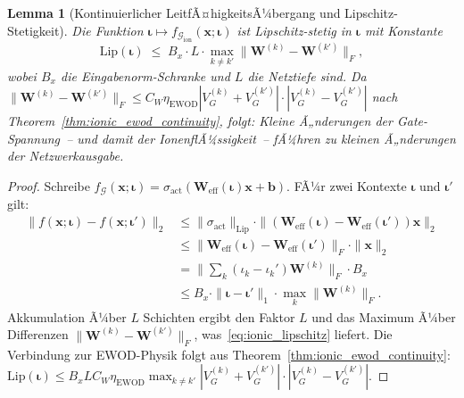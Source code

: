 ﻿\documentclass[12pt, a4paper, openany]{report}
\newtheorem{lemma}[theorem]{Lemma}
\newcommand{\calG}{\mathcal{G}}
\begin{document}
\begin{lemma}[Kontinuierlicher LeitfÃ¤higkeitsÃ¼bergang und Lipschitz-Stetigkeit]
\label{lem:ionic_lipschitz}
Die Funktion $\bm{\iota} \mapsto f_{\calG_{\mathrm{ion}}}(\bm{x};\bm{\iota})$
ist Lipschitz-stetig in $\bm{\iota}$ mit Konstante
\begin{equation}
  \label{eq:ionic_lipschitz}
  \mathrm{Lip}(\bm{\iota}) \;\leq\; B_x \cdot L \cdot
  \max_{k \neq k'} \|\bm{W}^{(k)} - \bm{W}^{(k')}\|_F,
\end{equation}
wobei $B_x$ die Eingabenorm-Schranke und $L$ die Netztiefe sind.
Da $\|\bm{W}^{(k)}-\bm{W}^{(k')}\|_F \leq C_W \eta_{\mathrm{EWOD}}
|V_G^{(k)}+V_G^{(k')}|  \cdot |V_G^{(k)}-V_G^{(k')}|$
nach Theorem~\ref{thm:ionic_ewod_continuity}, folgt: Kleine
Ã„nderungen der Gate-Spannung~-- und damit der IonenflÃ¼ssigkeit~--
fÃ¼hren zu kleinen Ã„nderungen der Netzwerkausgabe.
\end{lemma}

\begin{proof}
Schreibe $f_{\calG}(\bm{x}; \bm{\iota}) = \sigma_{\mathrm{act}}(\bm{W}_{\mathrm{eff}}(\bm{\iota})\bm{x}
+ \bm{b})$.  FÃ¼r zwei Kontexte $\bm{\iota}$ und $\bm{\iota}'$ gilt:
\begin{align*}
  \|f(\bm{x};\bm{\iota}) - f(\bm{x};\bm{\iota}')\|_2
  &\leq \|\sigma_{\mathrm{act}}\|_{\mathrm{Lip}} \cdot \|(\bm{W}_{\mathrm{eff}}(\bm{\iota})
    - \bm{W}_{\mathrm{eff}}(\bm{\iota}'))\bm{x}\|_2 \\
  &\leq \|\bm{W}_{\mathrm{eff}}(\bm{\iota}) - \bm{W}_{\mathrm{eff}}(\bm{\iota}')\|_F
    \cdot \|\bm{x}\|_2 \\
  &= \bigl\|\sum_k (\iota_k - \iota_k')\bm{W}^{(k)}\bigr\|_F \cdot B_x \\
  &\leq B_x \cdot \|\bm{\iota} - \bm{\iota}'\|_1 \cdot \max_k \|\bm{W}^{(k)}\|_F.
\end{align*}
Akkumulation Ã¼ber $L$ Schichten ergibt den Faktor $L$ und das Maximum
Ã¼ber Differenzen $\|\bm{W}^{(k)} - \bm{W}^{(k')}\|_F$, was~\eqref{eq:ionic_lipschitz}
liefert.  Die Verbindung zur EWOD-Physik folgt aus
Theorem~\ref{thm:ionic_ewod_continuity}: $\mathrm{Lip}(\bm{\iota}) \leq
B_x L C_W \eta_{\mathrm{EWOD}} \max_{k\neq k'} |V_G^{(k)}+V_G^{(k')}|
\cdot |V_G^{(k)}-V_G^{(k')}|$.
\end{proof}
\end{document}
